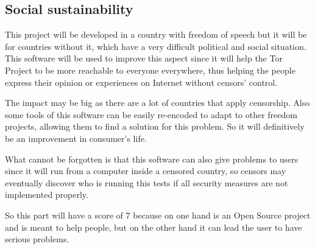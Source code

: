 \subsection{Social sustainability}
This project will be developed in a country with freedom of speech but it will be for countries without it, which have a very difficult political and social situation. This software will be used to improve this aspect since it will help the Tor Project to be more reachable to everyone everywhere, thus helping the people express their opinion or experiences on Internet without censors' control. 

The impact may be big as there are a lot of countries that apply censorship. Also some tools of this software can be easily re-encoded to adapt to other freedom projects, allowing them to find a solution for this problem. So it will definitively be an improvement in consumer's life. 

What cannot be forgotten is that this software can also give problems to users since it will run from a computer inside a censored country, so censors may eventually discover who is running this tests if all security measures are not implemented properly. 

So this part will have a score of 7 because on one hand is an Open Source project and is meant to help people, but on the other hand it can lead the user to have serious problems. 